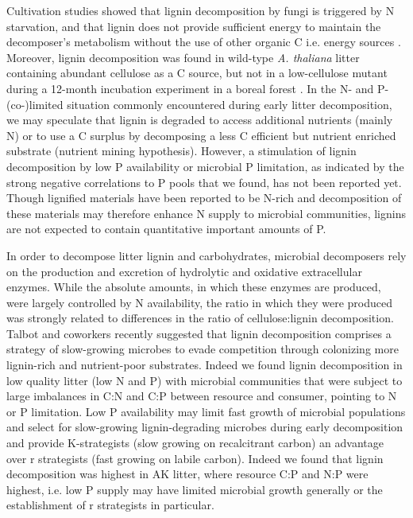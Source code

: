 Cultivation studies showed that lignin decomposition by fungi is triggered by N starvation, and that lignin does not provide sufficient energy to maintain the decomposer's metabolism without the use of other organic C i.e. energy sources \cite{Janshekar1988}. Moreover, lignin decomposition was found in wild-type \emph{A. thaliana} litter containing abundant cellulose as a C source, but not in a low-cellulose mutant during a 12-month incubation experiment in a boreal forest \cite{Talbot2011}. In the N- and P-(co-)limited situation commonly encountered during early litter decomposition, we may speculate that lignin is degraded to access additional nutrients (mainly N) or to use a C surplus by decomposing a less C efficient but nutrient enriched substrate (nutrient mining hypothesis). However, a stimulation of lignin decomposition by low P availability or microbial P limitation, as indicated by the strong negative correlations to P pools that we found, has not been reported yet. Though lignified materials have been reported to be N-rich and decomposition of these materials may therefore enhance N supply to microbial communities, lignins are not expected to contain quantitative important amounts of P.

In order to decompose litter lignin and carbohydrates, microbial decomposers rely on the production and excretion of hydrolytic and oxidative extracellular enzymes. While the absolute amounts, in which these enzymes are produced, were largely controlled by N availability, the ratio in which they were produced was strongly related to differences in the ratio of cellulose:lignin decomposition. Talbot and coworkers\cite{Talbot2011} recently suggested that lignin decomposition comprises a strategy of slow-growing microbes to evade competition through colonizing more lignin-rich and nutrient-poor substrates. Indeed we found lignin decomposition in low quality litter (low N and P) with microbial communities that were subject to large imbalances in C:N and C:P between resource and consumer, pointing to N or P limitation. Low P availability may limit fast growth of microbial populations and select for slow-growing lignin-degrading microbes during early decomposition and provide K-strategists (slow growing on recalcitrant carbon) an advantage over r strategists (fast growing on labile carbon). Indeed we found that lignin decomposition was highest in AK litter, where resource C:P and N:P were highest, i.e. low P supply may have limited microbial growth generally or the establishment of r strategists in particular.

